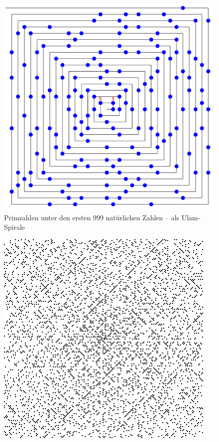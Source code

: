 \begin{refsegment}
\begin{figure}[!hb]
\begin{center}
\includegraphics[scale=0.41]{figures/Ulam_spiral_via-CT2-within-1-999.png}
\caption[Primzahlen unter den ersten 999 natürlichen Zahlen -- als Ulam-Spirale]
        {Primzahlen unter den ersten 999 natürlichen Zahlen -- als Ulam-Spirale\protect\footnotemark}
\label{Primes-in-a-999-integer-ulam-spiral-figure}
\end{center}
\end{figure}
\begin{figure}[!hb]
\begin{center}
\includegraphics{figures/Ulam_spiral_Wikipedia.png}

\end{center}
\end{figure}
\end{refsegment}

